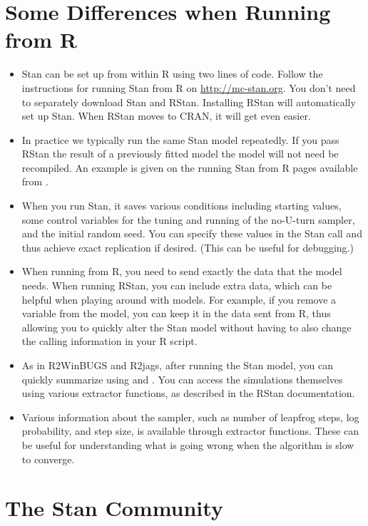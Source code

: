 \section{Some Differences when Running from R}

\begin{itemize}

\item Stan can be set up from within R using two lines of code.
  Follow the instructions for running Stan from R on
  \url{http://mc-stan.org}.  You don't need to separately download
  Stan and RStan.  Installing RStan will automatically set up Stan.
  When RStan moves to CRAN, it will get even easier.
\item In practice we typically run the same Stan model repeatedly.  If
  you pass RStan the result of a previously fitted model the model will
  not need be recompiled. An example is given on the running
  Stan from R pages available from .
\item When you run Stan, it saves various conditions including
  starting values, some control variables for the tuning and running
  of the no-U-turn sampler, and the initial random seed. You can
  specify these values in the Stan call and thus achieve exact
  replication if desired.  (This can be useful for debugging.)
\item When running \BUGS from R, you need to send exactly the data
  that the model needs.  When running RStan, you can include extra
  data, which can be helpful when playing around with models.  For
  example, if you remove a variable  from the model, you can keep
  it in the data sent from R, thus allowing you to quickly alter the
  Stan model without having to also change the calling information in
  your R script.
\item As in R2WinBUGS and R2jags, after running the Stan model, you
  can quickly summarize using  and .  You
  can access the simulations themselves using various extractor
  functions, as described in the RStan documentation.
\item Various information about the sampler, such as number of
  leapfrog steps, log probability, and step size, is available through
  extractor functions.   These can be useful for understanding what is
  going wrong when the algorithm is slow to converge.
\end{itemize}

\section{The Stan Community}

